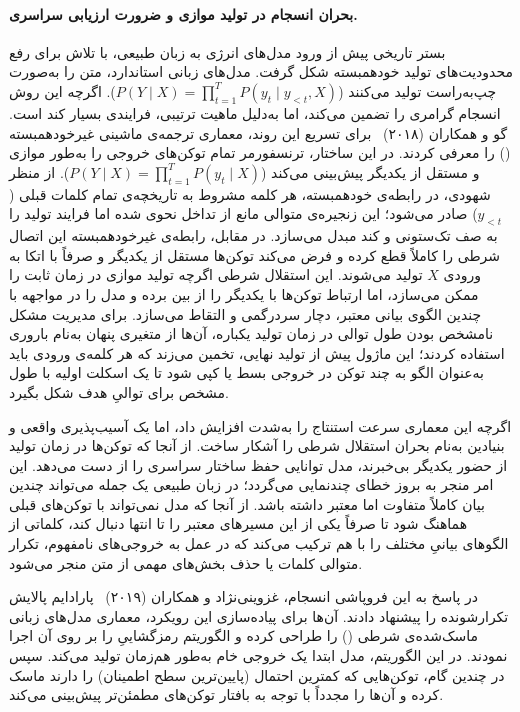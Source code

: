 \paragraph{بحران انسجام در تولید موازی و ضرورت ارزیابی سراسری.}

بستر تاریخی پیش از ورود مدل‌های انرژی به زبان طبیعی، با تلاش برای رفع محدودیت‌های تولید خودهمبسته شکل گرفت. مدل‌های زبانی استاندارد، متن را به‌صورت چپ‌به‌راست تولید می‌کنند ($P(Y \mid X) = \prod_{t=1}^T P(y_t \mid y_{<t}, X)$). اگرچه این روش انسجام گرامری را تضمین می‌کند، اما به‌دلیل ماهیت ترتیبی، فرایندی بسیار کند است. گو و همکاران (۲۰۱۸)~\cite{gu2018nonautoregressive} برای تسریع این روند، معماری ترجمه‌ی ماشینی غیرخودهمبسته () را معرفی کردند. در این ساختار، ترنسفورمر تمام توکن‌های خروجی را به‌طور موازی و مستقل از یکدیگر پیش‌بینی می‌کند ($P(Y \mid X) = \prod_{t=1}^T P(y_t \mid X)$). از منظر شهودی، در رابطه‌ی خودهمبسته، هر کلمه مشروط به تاریخچه‌ی تمام کلمات قبلی ($y_{<t}$) صادر می‌شود؛ این زنجیره‌ی متوالی مانع از تداخل نحوی شده اما فرایند تولید را به صف تک‌ستونی و کند مبدل می‌سازد. در مقابل، رابطه‌ی غیرخودهمبسته این اتصال شرطی را کاملاً قطع کرده و فرض می‌کند توکن‌ها مستقل از یکدیگر و صرفاً با اتکا به ورودی $X$ تولید می‌شوند. این استقلال شرطی اگرچه تولید موازی در زمان ثابت را ممکن می‌سازد، اما ارتباط توکن‌ها با یکدیگر را از بین برده و مدل را در مواجهه با چندین الگوی بیانی معتبر، دچار سردرگمی و التقاط می‌سازد. برای مدیریت مشکل نامشخص بودن طول توالی در زمان تولید یکباره، آن‌ها از متغیری پنهان به‌نام باروری استفاده کردند؛ این ماژول پیش از تولید نهایی، تخمین می‌زند که هر کلمه‌ی ورودی باید به‌عنوان الگو به چند توکن در خروجی بسط یا کپی شود تا یک اسکلت اولیه با طول مشخص برای توالیِ هدف شکل بگیرد.

اگرچه این معماری سرعت استنتاج را به‌شدت افزایش داد، اما یک آسیب‌پذیری واقعی و بنیادین به‌نام بحران استقلال شرطی را آشکار ساخت. از آنجا که توکن‌ها در زمان تولید از حضور یکدیگر بی‌خبرند، مدل توانایی حفظ ساختار سراسری را از دست می‌دهد. این امر منجر به بروز خطای چندنمایی می‌گردد؛ در زبان طبیعی یک جمله می‌تواند چندین بیان کاملاً متفاوت اما معتبر داشته باشد. از آنجا که مدل  نمی‌تواند با توکن‌های قبلی هماهنگ شود تا صرفاً یکی از این مسیرهای معتبر را تا انتها دنبال کند، کلماتی از الگوهای بیانیِ مختلف را با هم ترکیب می‌کند که در عمل به خروجی‌های نامفهوم، تکرار متوالی کلمات یا حذف بخش‌های مهمی از متن منجر می‌شود.

در پاسخ به این فروپاشی انسجام، غزوینی‌نژاد و همکاران (۲۰۱۹)~\cite{ghazvininejad2019maskpredict} پارادایم پالایش تکرارشونده را پیشنهاد دادند. آن‌ها برای پیاده‌سازی این رویکرد، معماری مدل‌های زبانی ماسک‌شده‌ی شرطی () را طراحی کرده و الگوریتم رمزگشاییِ  را بر روی آن اجرا نمودند. در این الگوریتم، مدل ابتدا یک خروجی خام به‌طور هم‌زمان تولید می‌کند. سپس در چندین گام، توکن‌هایی که کمترین احتمال (پایین‌ترین سطح اطمینان) را دارند ماسک کرده و آن‌ها را مجدداً با توجه به بافتار توکن‌های مطمئن‌تر پیش‌بینی می‌کند.

